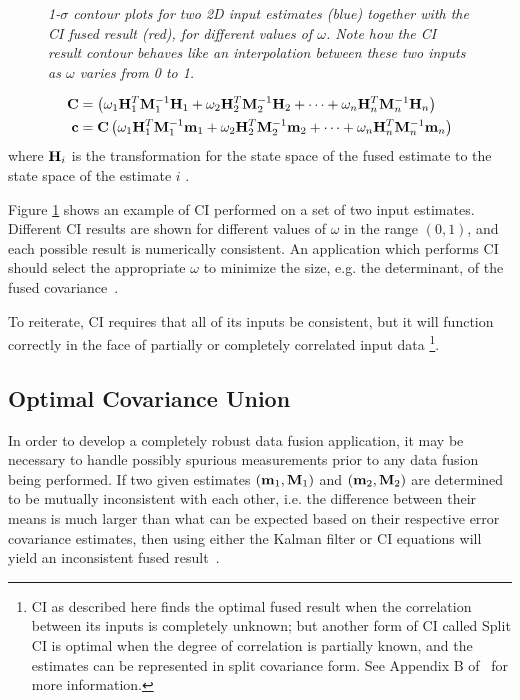 \begin{figure}[tbp]
    \caption{\it 1-$\sigma$ contour plots for two 2D input estimates (blue) together with the CI fused result (red), for
        different values of $\omega$. Note how the CI result contour behaves like an interpolation between these two
        inputs as $\omega$ varies from 0 to 1. }
    \label{fig:ci2d}
\end{figure}
\begin{align}
    \mathbf{C} &= \left(\omega_1\mathbf{H}_1^T\mathbf{M}^{-1}_1\mathbf{H}_1+\omega_2\mathbf{H}_2^T\mathbf{M}^{-1}_2\mathbf{H}_2+\dots+\omega_n\mathbf{H}_n^T\mathbf{M}^{-1}_n\mathbf{H}_n\right)\label{eqn:cicov}\\
    \mathbf{c} &= \mathbf{C}\left(\omega_1\mathbf{H}_1^T\mathbf{M}^{-1}_1\mathbf{m}_1+\omega_2\mathbf{H}_2^T\mathbf{M}^{-1}_2\mathbf{m}_2+\dots+\omega_n\mathbf{H}_n^T\mathbf{M}^{-1}_n\mathbf{m}_n\right)\label{eqn:cimean}
\end{align}
where $\mathbf{H}_i$ is the transformation for the state space of the fused estimate to the state space of the estimate $i$
\cite{uhlmann03,fusion01}.

Figure \ref{fig:ci2d} shows an example of CI performed on a set of two input estimates. Different CI results are shown
for different values of $\omega$ in the range $(0,1)$, and each possible result is numerically consistent. An application which
performs CI should select the appropriate $\omega$ to minimize the size, e.g. the determinant, of the fused
covariance~\cite{uhlmann03}.

To reiterate, CI requires that all of its inputs be consistent, but it will function correctly in the face of partially
or completely correlated input data \footnote{CI as described here finds the optimal fused result when the correlation
between its inputs is completely unknown; but another form of CI called Split CI is optimal when the degree of
correlation is partially known, and the estimates can be represented in split covariance form. See Appendix B
of~\cite{uhlmann03} for more information.}.



\subsection{Optimal Covariance Union}\label{section:cu}

In order to develop a completely robust data fusion application, it may be necessary to handle possibly spurious
measurements prior to any data fusion being performed. If two given estimates $(\mathbf{m}_1,\mathbf{M}_1)$ and
$(\mathbf{m}_2,\mathbf{M}_2)$ are determined to be mutually inconsistent with each other, i.e. the difference between their means
is much larger than what can be expected based on their respective error covariance estimates, then using either the
Kalman filter or CI equations will yield an inconsistent fused result~\cite{uhlmann03}.

